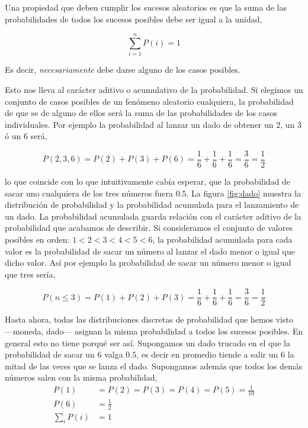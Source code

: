 Una propiedad que deben cumplir los sucesos aleatorios es que la suma de las probabilidades de todos los sucesos posibles debe ser igual a la unidad,

\begin{equation*}
\sum_{i=1}^n P(i) = 1
\end{equation*}

Es decir, \emph{necesariamente} debe darse alguno de los casos posibles.

Esto nos lleva al carácter aditivo o acumulativo de la probabilidad. Si elegimos un conjunto de casos posibles de un fenómeno aleatorio cualquiera, la probabilidad de que se de alguno de ellos será la suma de las probabilidades de los casos individuales. Por ejemplo la probabilidad al lanzar un dado de obtener un $2$, un $3$ ó un $6$ será,

\begin{equation*}
P(2,3,6) = P(2) + P(3) + P(6) = \frac{1}{6}+\frac{1}{6}+\frac{1}{6}=\frac{3}{6} = \frac{1}{2}
\end{equation*} 

lo que coincide con lo que intuitivamente cabía esperar, que la probabilidad de sacar uno cualquiera de los tres números fuera $0.5$.
La figura \ref{fig:dado} muestra la distribución de probabilidad y la probabilidad acumulada para el lanzamiento de un dado. La probabilidad acumulada guarda relación con el carácter aditivo de la probabilidad que acabamos de describir. Si consideramos el conjunto de valores posibles en orden: $1 < 2 < 3 < 4 < 5 < 6$, la probabilidad acumulada para cada valor es la probabilidad de sacar un número al lanzar el dado menor o igual que dicho valor. Así por ejemplo la probabilidad de sacar un número menor o igual que tres sería,

\begin{equation*}
P(n\leqslant 3) = P(1) + P(2) + P(3) = \frac{1}{6}+\frac{1}{6}+\frac{1}{6}=\frac{3}{6} = \frac{1}{2}
\end{equation*} 

Hasta ahora, todas las distribuciones discretas de probabilidad que hemos visto ---moneda, dado--- asignan la misma probabilidad a todos los sucesos posibles. En general esto no tiene porqué ser así. Supongamos un dado trucado en el que la probabilidad de sacar un $6$ valga $0.5$, es decir en promedio tiende a salir un $6$ la mitad de las veces que se lanza el dado. Supongamos además que todos los demás números salen con la misma probabilidad,
\begin{align*}
P(1)& = P(2) = P(3) = P(4) = P(5) = \frac{1}{10}\\
P(6)& = \frac{1}{2}\\
\sum_i P(i)& = 1 
\end{align*}

